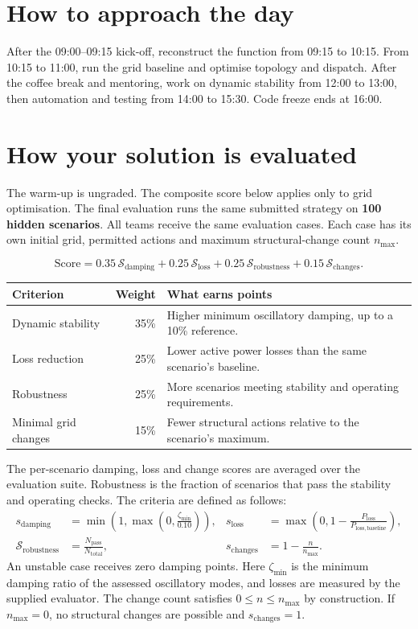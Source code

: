 \documentclass[10pt,a4paper]{article}
\begin{document}
\section{How to approach the day}
After the 09:00--09:15 kick-off, reconstruct the function from 09:15 to 10:15.
From 10:15 to 11:00, run the grid baseline and optimise topology and dispatch.
After the coffee break and mentoring, work on dynamic stability from 12:00 to
13:00, then automation and testing from 14:00 to 15:30. Code freeze ends at 16:00.

\newpage
\section{How your solution is evaluated}
The warm-up is ungraded. The composite score below applies only to grid optimisation.
The final evaluation runs the same submitted strategy on \textbf{100 hidden scenarios}.
All teams receive the same evaluation cases. Each case has its own initial grid,
permitted actions and maximum structural-change count $n_{\max}$.

\begin{equation*}
  \mathrm{Score}=0.35\,\mathcal S_{\mathrm{damping}}
  +0.25\,\mathcal S_{\mathrm{loss}}
  +0.25\,\mathcal S_{\mathrm{robustness}}
  +0.15\,\mathcal S_{\mathrm{changes}}.
\end{equation*}
\begingroup
\renewcommand{\arraystretch}{1.2}
\begin{tabularx}{\textwidth}{@{}l r X@{}}
\toprule
\textbf{Criterion} & \textbf{Weight} & \textbf{What earns points}\\
\midrule
Dynamic stability & 35\% & Higher minimum oscillatory damping, up to a 10\% reference.\\
Loss reduction & 25\% & Lower active power losses than the same scenario's baseline.\\
Robustness & 25\% & More scenarios meeting stability and operating requirements.\\
Minimal grid changes & 15\% & Fewer structural actions relative to the scenario's maximum.\\
\bottomrule
\end{tabularx}
\endgroup

The per-scenario damping, loss and change scores are averaged over the evaluation
suite. Robustness is the fraction of scenarios that pass the stability and
operating checks. The criteria are defined as follows:
\begin{align*}
 s_{\mathrm{damping}}&=\min\!\left(1,\max\!\left(0,\frac{\zeta_{\min}}{0.10}\right)\right),
 &s_{\mathrm{loss}}&=\max\!\left(0,1-\frac{P_{\mathrm{loss}}}{P_{\mathrm{loss,baseline}}}\right),\\
 \mathcal S_{\mathrm{robustness}}&=\frac{N_{\mathrm{pass}}}{N_{\mathrm{total}}},
 &s_{\mathrm{changes}}&=1-\frac{n}{n_{\max}}.
\end{align*}
An unstable case receives zero damping points. Here $\zeta_{\min}$ is the minimum
damping ratio of the assessed oscillatory modes, and losses are measured by the
supplied evaluator. The change count satisfies $0\le n\le n_{\max}$ by construction.
If $n_{\max}=0$, no structural changes are possible and $s_{\mathrm{changes}}=1$.
\end{document}
